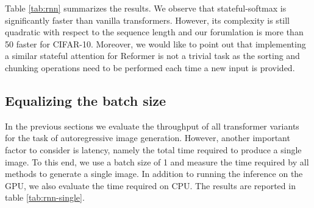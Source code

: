 \documentclass{article}
\begin{document}
Table \ref{tab:rnn} summarizes the results. We observe that stateful-softmax is
significantly faster than vanilla transformers. However, its complexity is
still quadratic with respect to the sequence length and our forumlation is more
than 50 faster for CIFAR-10. Moreover, we would like to point out that
implementing a similar stateful attention for Reformer is not a trivial task as
the sorting and chunking operations need to be performed each time a new input
is provided.

\subsection{Equalizing the batch size} \label{sec:imgen-discussion-2}

In the previous sections we evaluate the throughput of all transformer variants
for the task of autoregressive image generation. However, another important
factor to consider is latency, namely the total time required to produce a
single image. To this end, we use a batch size of 1 and measure the time
required by all methods to generate a single image. In addition to running the
inference on the GPU, we also evaluate the time required on CPU. The results
are reported in table \ref{tab:rnn-single}.
\end{document}
